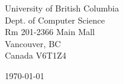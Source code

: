 \begin{minipage}{0.49\textwidth}
\begin{flushleft}
\noindent
University of British Columbia  \\
Dept. of Computer Science \\
Rm 201-2366 Main Mall \\
Vancouver, BC \\
Canada V6T1Z4
\end{flushleft}
\end{minipage}
\begin{minipage}{0.47\textwidth}
\begin{flushright}
\today
\end{flushright}
\end{minipage} \\

\newcommand{\univ}{University of British Columbia}
\newcommand{\univshort}{UBC}
\newcommand{\degree}{M.Sc.}
\newcommand{\dept}{Computer Science}
